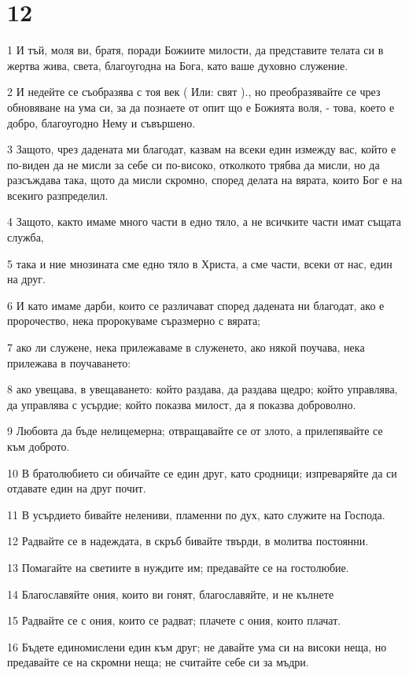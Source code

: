\chapter{12}

\par 1 И тъй, моля ви, братя, поради Божиите милости, да представите телата си в жертва жива, света, благоугодна на Бога, като ваше духовно служение.
\par 2 И недейте се съобразява с тоя век ( Или: свят )., но преобразявайте се чрез обновяване на ума си, за да познаете от опит що е Божията воля, - това, което е добро, благоугодно Нему и съвършено.
\par 3 Защото, чрез дадената ми благодат, казвам на всеки един измежду вас, който е по-виден да не мисли за себе си по-високо, отколкото трябва да мисли, но да разсъждава така, щото да мисли скромно, според делата на вярата, които Бог е на всекиго разпределил.
\par 4 Защото, както имаме много части в едно тяло, а не всичките части имат същата служба,
\par 5 така и ние мнозината сме едно тяло в Христа, а сме части, всеки от нас, един на друг.
\par 6 И като имаме дарби, които се различават според дадената ни благодат, ако е пророчество, нека пророкуваме съразмерно с вярата;
\par 7 ако ли служене, нека прилежаваме в служенето, ако някой поучава, нека прилежава в поучаването:
\par 8 ако увещава, в увещаването: който раздава, да раздава щедро; който управлява, да управлява с усърдие; който показва милост, да я показва доброволно.
\par 9 Любовта да бъде нелицемерна; отвращавайте се от злото, а прилепявайте се към доброто.
\par 10 В братолюбието си обичайте се един друг, като сродници; изпреваряйте да си отдавате един на друг почит.
\par 11 В усърдието бивайте нелениви, пламенни по дух, като служите на Господа.
\par 12 Радвайте се в надеждата, в скръб бивайте твърди, в молитва постоянни.
\par 13 Помагайте на светиите в нуждите им; предавайте се на гостолюбие.
\par 14 Благославяйте ония, които ви гонят, благославяйте, и не кълнете
\par 15 Радвайте се с ония, които се радват; плачете с ония, които плачат.
\par 16 Бъдете единомислени един към друг; не давайте ума си на високи неща, но предавайте се на скромни неща; не считайте себе си за мъдри.

